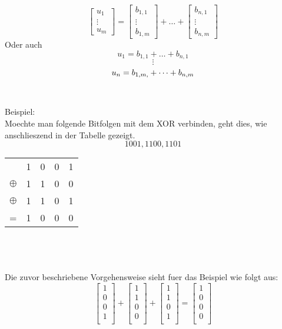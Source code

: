 \documentclass[a4paper,10pt,ngerman]{scrartcl}
\begin{document}
$$
\begin{bmatrix}
           u_{1} \\
           \vdots \\
           u_{m}
         \end{bmatrix}
				 = 
				\begin{bmatrix}
           b_{1, 1} \\
           \vdots \\
           b_{1, m}
         \end{bmatrix}
				+
				\dots
				+
				\begin{bmatrix}
           b_{n, 1} \\
           \vdots \\
           b_{n, m}
         \end{bmatrix}
$$
Oder auch
$$
u_{1} = b_{1, 1} + \dots + b_{n, 1} 
$$
$$
\vdots
$$
$$
u_{n} = b_{1, m,} + \dots + b_{n, m} \\
$$
\\\\
Beispiel:\\
Moechte man folgende Bitfolgen mit dem XOR verbinden, geht dies, wie anschlieszend in der Tabelle gezeigt.
\[1001, 1100, 1101\]
\begin{tabular}[c]{ c | c | c | c | c }			
   & 1 & 0 & 0 & 1 \\
  \(\oplus\) & 1 & 1 & 0 & 0 \\
  \(\oplus\) & 1 & 1 & 0 & 1 \\
	\hline
	= & 1 & 0 & 0 & 0 \\ 
\end{tabular}   
\\\\\\Die zuvor beschriebene Vorgehensweise sieht fuer das Beispiel wie folgt aus:
$$
\begin{bmatrix}
           1 \\
           0 \\
           0 \\
           1 \\
         \end{bmatrix}
         + 
\begin{bmatrix}
           1 \\
           1 \\
           0 \\
           0 \\
         \end{bmatrix}
         + 
\begin{bmatrix}
           1 \\
           1 \\
           0 \\
           1 \\
         \end{bmatrix}
         = 
\begin{bmatrix}
           1 \\
           0 \\
           0 \\
           0 \\
         \end{bmatrix}
$$
\end{document}
